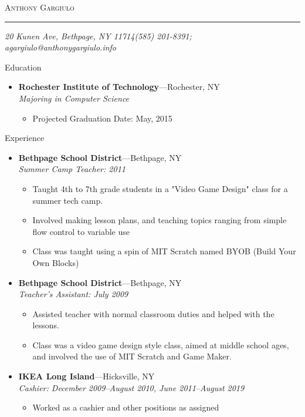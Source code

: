 \documentclass[11pt,oneside]{article}
\makeatletter
\newcommand{\name}{Anthony Gargiulo}
\newcommand{\addr}{20 Kunen Ave, Bethpage, NY 11714}
\newcommand{\phone}{(585) 201-8391}
\newcommand{\email}{agargiulo@anthonygargiulo.info}
\newcommand{\bigname}[1]{
	\begin{center}\fontfamily{phv}\selectfont\Huge\scshape#1\end{center}
}
\newenvironment{ressection}[1]{
	\vspace{4pt}
	{\fontfamily{phv}\selectfont\Large#1}
	\begin{itemize}
	\vspace{3pt}
}{
	\end{itemize}
}
\newcommand{\ressubitem}[1]{
	\vspace{-1pt}
	\item \begin{flushleft} #1 \end{flushleft}
}
\newcommand{\resbigitem}[3]{
	\vspace{-5pt}
	\item
	\textbf{#1}---#2 \\
	\textit{#3}
}
\newenvironment{ressubsec}[3]{
	\resbigitem{#1}{#2}{#3}
	\vspace{-2pt}
	\begin{itemize}
}{
	\end{itemize}
}
\makeatother
\begin{document}
 \selectfont

\bigname{\name}

\vspace{-8pt} \rule{\textwidth}{1pt}

\vspace{-1pt} {\small\itshape \addr \hfill \phone; \email}

\vspace{8 pt}




\begin{ressection}{Education}

	\begin{ressubsec}{Rochester Institute of Technology}{Rochester, NY}{Majoring in Computer Science}
		\ressubitem{Projected Graduation Date: May, 2015}
	\end{ressubsec}

\end{ressection}


\begin{ressection}{Experience}

	\begin{ressubsec}{Bethpage School District}{Bethpage, NY}{Summer Camp Teacher: 2011}
		\ressubitem{Taught 4th to 7th grade students in a "Video Game Design" class for a summer tech camp.}
		\ressubitem{Involved making lesson plans, and teaching topics ranging from simple flow control to variable use}
		\ressubitem{Class was taught using a spin of MIT Scratch named BYOB (Build Your Own Blocks)}
	\end{ressubsec}

	\begin{ressubsec}{Bethpage School District}{Bethpage, NY}{Teacher's Assistant: July 2009}
		\ressubitem{Assisted teacher with normal classroom duties and helped with the lessons.}
		\ressubitem{Class was a video game design style class, aimed at middle school ages, and involved the use of MIT Scratch and Game Maker.}
	\end{ressubsec}

	\begin{ressubsec}{IKEA Long Island}{Hicksville, NY}{Cashier: December 2009--August 2010, June 2011--August 2019}
		\ressubitem{Worked as a cashier and other positions as assigned}
	\end{ressubsec}

\end{ressection}
\end{document}
